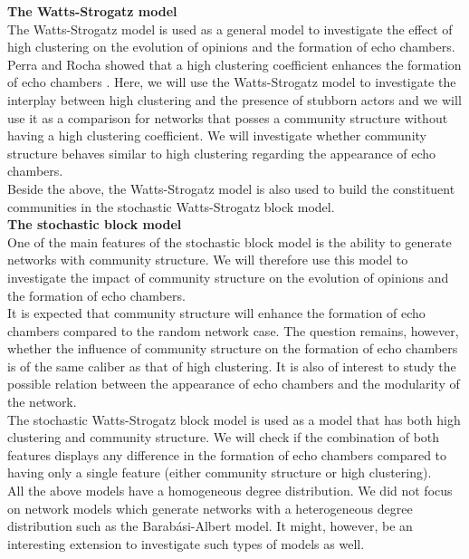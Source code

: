 \documentclass[11 pt , letterpaper , twoside , openright]{book}
\begin{document}
\textbf{The Watts-Strogatz model}\\
\newline
The Watts-Strogatz model is used as a general model to investigate the effect of high clustering on the evolution of opinions and the formation of echo chambers.\\
\newline
Perra and Rocha showed that a high clustering coefficient enhances the formation of echo chambers \cite{Perra2019}. Here, we will use the Watts-Strogatz model to investigate the interplay between high clustering and the presence of stubborn actors and we will use it as a comparison for networks that posses a community structure without having a high clustering coefficient. We will investigate whether community structure behaves similar to high clustering regarding the appearance of echo chambers.\\
\newline
Beside the above, the Watts-Strogatz model is also used to build the constituent communities in the stochastic Watts-Strogatz block model.\\
\newline
\textbf{The stochastic block model}\\
\newline
One of the main features of the stochastic block model is the ability to generate networks with community structure. We will therefore use this model to investigate the impact of community structure on the evolution of opinions and the formation of echo chambers.\\
\newline
It is expected that community structure will enhance the formation of echo chambers compared to the random network case. The question remains, however, whether the influence of community structure on the formation of echo chambers is of the same caliber as that of high clustering. It is also of interest to study the possible relation between the appearance of echo chambers and the modularity of the network.\\
\newline
The stochastic Watts-Strogatz block model is used as a model that has both high clustering and community structure. We will check if the combination of both features displays any difference in the formation of echo chambers compared to having only a single feature (either community structure or high clustering).\\
\newline
All the above models have a homogeneous degree distribution. We did not focus on network models which generate networks with a heterogeneous degree distribution such as the Barab\'{a}si-Albert model. It might, however, be an interesting extension to investigate such types of models as well.\\
\end{document}
